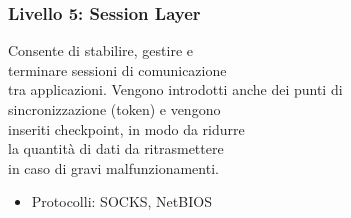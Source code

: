 \documentclass[aspectratio=169]{beamer}
\begin{document}
    \begin{frame}
      \frametitle{Livello 5: Session Layer}%
      
      
      Consente di stabilire, gestire e\\ terminare sessioni di comunicazione\\tra applicazioni.
      \vskip 0.3cm
      Vengono introdotti anche dei punti di\\ sincronizzazione (token) e vengono\\inseriti checkpoint, in modo da ridurre\\la quantità di dati da ritrasmettere\\in caso di gravi malfunzionamenti.
        \begin{itemize}
            \item Protocolli: SOCKS, NetBIOS
        \end{itemize}
    \end{frame}
    
\end{document}
